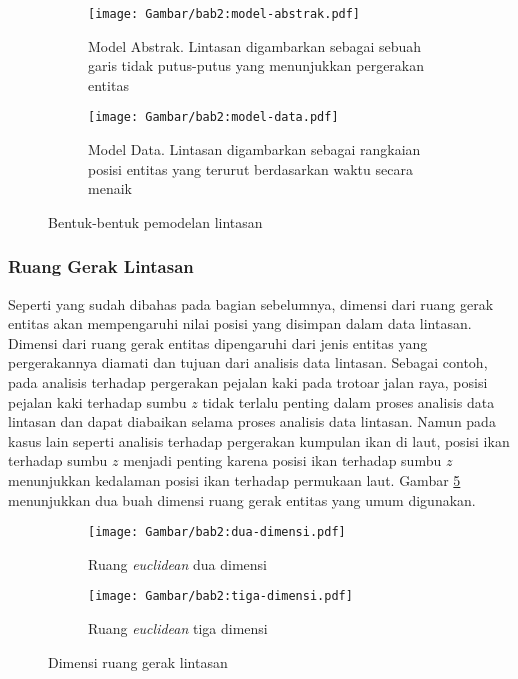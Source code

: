 \documentclass[a4paper,twoside]{article}
\begin{document}
\begin{figure}[h]
    \centering
    \begin{subfigure}[b]{0.4\textwidth}
        \centering
        \texttt{[image: Gambar/bab2:model-abstrak.pdf]}
        \caption{Model Abstrak. Lintasan digambarkan sebagai sebuah garis tidak putus-putus yang menunjukkan pergerakan entitas}
        \label{bab2:model-abstrak}
    \end{subfigure} \hspace{1cm}
    \begin{subfigure}[b]{0.4\textwidth}
        \centering
        \texttt{[image: Gambar/bab2:model-data.pdf]}
        \caption{Model Data. Lintasan digambarkan sebagai rangkaian posisi entitas yang terurut berdasarkan waktu secara menaik}
    \end{subfigure}
    \caption{Bentuk-bentuk pemodelan lintasan}
    \label{bab2:pemodelan-lintasan}
\end{figure}

\subsubsection{Ruang Gerak Lintasan}

Seperti yang sudah dibahas pada bagian sebelumnya, dimensi dari ruang gerak entitas akan mempengaruhi nilai posisi yang disimpan dalam data lintasan. Dimensi dari ruang gerak entitas dipengaruhi dari jenis entitas yang pergerakannya diamati dan tujuan dari analisis data lintasan. Sebagai contoh, pada analisis terhadap pergerakan pejalan kaki pada trotoar jalan raya, posisi pejalan kaki terhadap sumbu $z$ tidak terlalu penting dalam proses analisis data lintasan dan dapat diabaikan selama proses analisis data lintasan. Namun pada kasus lain seperti analisis terhadap pergerakan kumpulan ikan di laut, posisi ikan terhadap sumbu $z$ menjadi penting karena posisi ikan terhadap sumbu $z$ menunjukkan kedalaman posisi ikan terhadap permukaan laut. Gambar \ref{bab2:ruang-gerak} menunjukkan dua buah dimensi ruang gerak entitas yang umum digunakan.

\begin{figure}[t]
    \centering
    \begin{subfigure}[h]{0.35\textwidth}
        \centering
        \texttt{[image: Gambar/bab2:dua-dimensi.pdf]}
        \caption{Ruang \textit{euclidean} dua dimensi}
        \label{bab2:dua-dimensi}
    \end{subfigure} \hspace{2cm}
    \begin{subfigure}[h]{0.35\textwidth}
        \centering
        \texttt{[image: Gambar/bab2:tiga-dimensi.pdf]}
        \caption{Ruang \textit{euclidean} tiga dimensi}
        \label{bab2:tiga-dimensi}
    \end{subfigure}
    \caption{Dimensi ruang gerak lintasan}
    \label{bab2:ruang-gerak}
\end{figure}
\end{document}
